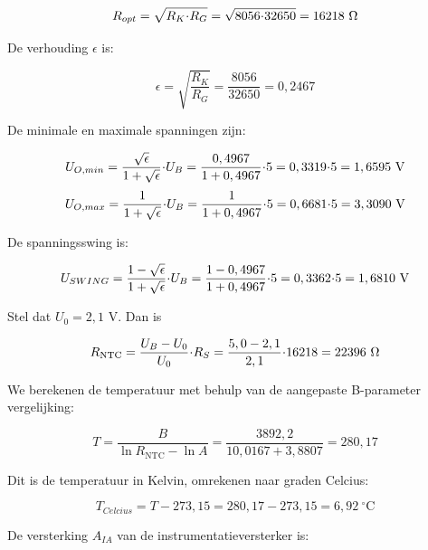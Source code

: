 \documentclass[12pt,a4paper,final,twoside,fleqn]{article}
\newcommand{\rntc}{R_\text{NTC}}
\newcommand{\ropt}{R_{opt}}
\let\oldcdot\cdot
\renewcommand{\cdot}{\kern-.10em\oldcdot\kern-.10em}
\begin{document}
\begin{equation}
\ropt = \sqrt{R_K\cdot R_G} = \sqrt{8056\cdot32650} = 16218\ \Omega
\end{equation}

De verhouding $\epsilon$ is: 

\begin{equation}
\epsilon = \sqrt{\dfrac{R_K}{R_G}} = \dfrac{8056}{32650} = 0,2467
\end{equation}

De minimale en maximale spanningen zijn:

\begin{equation}
U_{O,min} = \dfrac{\sqrt{\epsilon}}{1+\sqrt{\epsilon}}\cdot U_B
          = \dfrac{0,4967}{1+0,4967}\cdot 5 = 0,3319\cdot 5
          = 1,6595\ \text{V}
\end{equation}
\begin{equation}
U_{O,max} = \dfrac{1}{1+\sqrt{\epsilon}}\cdot U_B
          = \dfrac{1}{1+0,4967}\cdot 5 = 0,6681\cdot 5
          = 3,3090\ \text{V}
\end{equation}

De spanningsswing is:

\begin{equation}
U_{SWING} = \dfrac{1-\sqrt{\epsilon}}{1+\sqrt{\epsilon}}\cdot U_B
          = \dfrac{1-0,4967}{1+0,4967}\cdot 5 = 0,3362\cdot 5
          = 1,6810\ \text{V}
\end{equation}

Stel dat $U_0 = 2,1$ V. Dan is

\begin{equation}
\rntc = \dfrac{U_B-U_0}{U_0}\cdot R_S = \dfrac{5,0-2,1}{2,1}\cdot 16218 = 22396\ \Omega
\end{equation}

We berekenen de temperatuur met behulp van de aangepaste B-parameter vergelijking:

\begin{equation}
T = \dfrac{B}{\ln \rntc - \ln A} = \dfrac{3892,2}{10,0167+3,8807} = 280,17
\end{equation}

Dit is de temperatuur in Kelvin, omrekenen naar graden Celcius:

\begin{equation}
T_{Celcius} = T - 273,15 = 280,17 - 273,15 = 6,92\ ^\circ\text{C}
\end{equation}

De versterking $A_{IA}$ van de instrumentatieversterker is:
\end{document}
